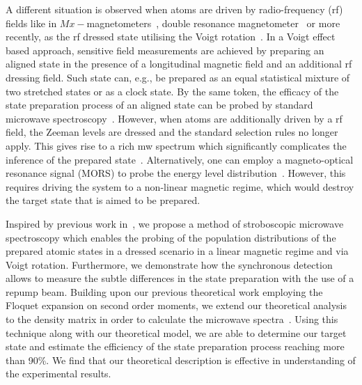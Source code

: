 \documentclass[%
reprint,
 amsmath,amssymb,
 aps,
floatfix,
]{revtex4-1}
\newcommand{\TP}[2][red]{\textcolor{#1}{\textit{TP: #2}}}
\begin{document}
A different situation is observed when atoms are driven by radio-frequency (rf) fields like in $Mx-$magnetometers~\cite{Groeger06}, double resonance magnetometer~\cite{Weis06} or more recently, as the rf dressed state utilising the Voigt rotation~\cite{Tadas19}.
In a Voigt effect based approach, sensitive field measurements are achieved by preparing an aligned state in the presence of a longitudinal magnetic field and an additional rf dressing field. 
Such state can, e.g., be prepared as an equal statistical mixture of two stretched states or as a clock state.
By the same token, the efficacy of the state preparation process of an aligned state can be probed by standard microwave spectroscopy~\cite{Avila87}. However, when atoms are additionally driven by a rf field, the Zeeman levels are dressed and the standard selection rules no longer apply. This gives rise to a rich mw spectrum which significantly complicates the inference of the prepared state~\cite{sinuco19}. Alternatively, one can employ a magneto-optical resonance signal (MORS) to probe the energy level distribution~\cite{brian_state04}. However, this requires driving the system to a non-linear magnetic regime, which would destroy the target state that is aimed to be prepared.

Inspired by previous work in~\cite{sinuco19}, we propose a method of stroboscopic microwave spectroscopy which enables the probing of the population distributions of the prepared atomic states in a dressed scenario in a linear magnetic regime and via Voigt rotation. Furthermore, we demonstrate how the synchronous detection allows to measure the subtle differences in the state preparation with the use of a repump beam. Building upon our previous theoretical work employing the Floquet expansion on second order moments, we extend our theoretical analysis to the density matrix in order to calculate the microwave spectra~\cite{Floquet21}. Using this technique along with our theoretical model, we are able to determine
our target state and estimate the efficiency of the state preparation process reaching more than %
90\%.  We find that our theoretical description is effective in understanding of the experimental results.
\end{document}
